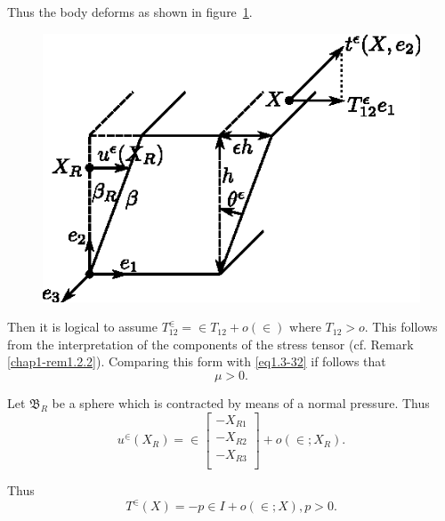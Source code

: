 Thus the body deforms as shown in figure~\ref{fig1.3.3}. 

\begin{figure}[H]
\includegraphics{vol71-figures/fig1.3-3.eps}
\medskip
\caption{}\label{fig1.3.3}
\end{figure}

Then it is logical to assume $T^{\in}_{12} = \in T_{12} + o(\in)$
where $T_{12} > o$. This follows from the interpretation of the
components of the stress tensor (cf. Remark
\ref{chap1-rem1.2.2}). Comparing 
this form with \eqref{eq1.3-32} if follows that  
\begin{equation*}
\mu > 0. \tag{1.3-34}\label{eq1.3-34}
\end{equation*}\pageoriginale

\begin{experiment}\label{chap1-experiment2}%
Let $\mathfrak{B}_R$ be a sphere which is contracted by means of a
normal pressure. Thus 
  \begin{equation*}
    u^\in (X_R) = \in
    \begin{bmatrix}
      -X_{R1}\\
      -X_{R2}\\
      -X_{R3}\\
    \end{bmatrix}
    + o(\in ; X_R). \tag{1.3-35}\label{eq1.3-35}
  \end{equation*}
\end{experiment}

Thus
\begin{equation*}
  T^\in(X) = - p \in I + o (\in ; X), p > 0. \tag{1.3-36}\label{eq1.3-36}
\end{equation*}

